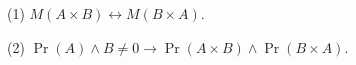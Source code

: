 (1) $M(A \times B) \leftrightarrow M(B \times A)$.

(2) $\Pr(A) \land B \neq 0 \rightarrow \Pr(A \times B) \land \Pr(B \times A)$.
